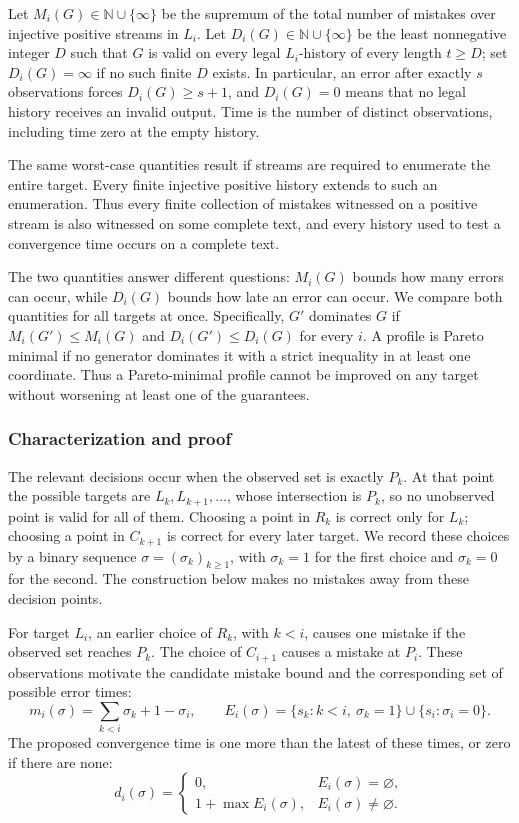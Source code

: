 Let $M_i(G)\in\mathbb N\cup\{\infty\}$ be the supremum of the total
number of mistakes over injective positive streams in $L_i$. Let
$D_i(G)\in\mathbb N\cup\{\infty\}$ be the least nonnegative integer
$D$ such that $G$ is valid on every legal $L_i$-history of every length
$t\ge D$; set $D_i(G)=\infty$ if no such finite $D$ exists. In
particular, an error after exactly $s$ observations forces
$D_i(G)\ge s+1$, and $D_i(G)=0$ means that no legal history receives
an invalid output. Time is the number of distinct observations,
including time zero at the empty history.

The same worst-case quantities result if streams are required to
enumerate the entire target. Every finite injective positive history
extends to such an enumeration. Thus every finite collection of
mistakes witnessed on a positive stream is also witnessed on some
complete text, and every history used to test a convergence time occurs on a
complete text.

The two quantities answer different questions: $M_i(G)$ bounds how many
errors can occur, while $D_i(G)$ bounds how late an error can occur.
We compare both quantities for all targets at once. Specifically, $G'$ dominates $G$ if
$M_i(G')\le M_i(G)$ and $D_i(G')\le D_i(G)$ for every $i$. A profile
is Pareto minimal if no generator dominates it with a strict inequality
in at least one coordinate. Thus a Pareto-minimal profile cannot be improved
on any target without worsening at least one of the guarantees.

\subsubsection{Characterization and proof}
\label{app:p29-frontier-proof}
The relevant decisions occur when the observed set is exactly $P_k$.
At that point the possible targets are $L_k,L_{k+1},\ldots$, whose
intersection is $P_k$, so no unobserved point is valid for all of them.
Choosing a point in $R_k$ is correct only for $L_k$; choosing a point
in $C_{k+1}$ is correct for every later target. We record these choices
by a binary sequence $\sigma=(\sigma_k)_{k\ge1}$, with $\sigma_k=1$
for the first choice and $\sigma_k=0$ for the second. The construction
below makes no mistakes away from these decision points.

For target $L_i$, an earlier choice of $R_k$, with $k<i$, causes one
mistake if the observed set reaches $P_k$. The choice of $C_{i+1}$
causes a mistake at $P_i$. These observations motivate the candidate
mistake bound and the corresponding set of possible error times:
\[
 m_i(\sigma)=\sum_{k<i}\sigma_k+1-\sigma_i,
 \qquad
 E_i(\sigma)=\{s_k:k<i,\ \sigma_k=1\}
              \cup\{s_i:\sigma_i=0\}.
\]
The proposed convergence time is one more than the latest of these times, or
zero if there are none:
\begin{equation}
\label{app:p29-frontier-deadline}
 d_i(\sigma)=
 \begin{cases}
  0,&E_i(\sigma)=\varnothing,\\
  1+\max E_i(\sigma),&E_i(\sigma)\ne\varnothing.
 \end{cases}
\end{equation}

